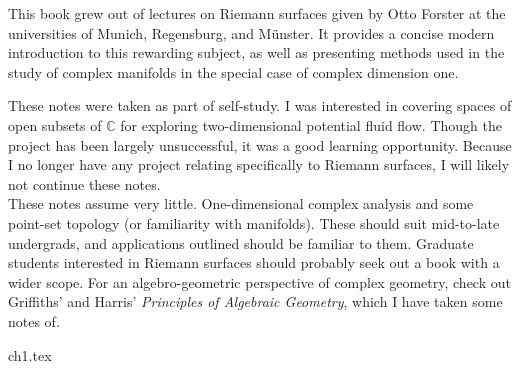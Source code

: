 \documentclass{../booknotes}
\begin{document}
\maketitle

\begin{pubdescrip}
This book grew out of lectures on Riemann surfaces given by Otto Forster at the universities of Munich, Regensburg, and Münster. It provides a concise modern introduction to this rewarding subject, as well as presenting methods used in the study of complex manifolds in the special case of complex dimension one.
\end{pubdescrip}

\begin{transcribernote}
	\indent These notes were taken as part of self-study. I was interested in covering spaces of open subsets of $ \mathbb{C} $ for exploring two-dimensional potential fluid flow. Though the project has been largely unsuccessful, it was a good learning opportunity. Because I no longer have any project relating specifically to Riemann surfaces, I will likely not continue these notes.\\
	\indent These notes assume very little. One-dimensional complex analysis and some point-set topology (or familiarity with manifolds). These should suit mid-to-late undergrads, and applications outlined should be familiar to them. Graduate students interested in Riemann surfaces should probably seek out a book with a wider scope. For an algebro-geometric perspective of complex geometry, check out Griffiths' and Harris' \textit{Principles of Algebraic Geometry}, which I have taken some notes of.
\end{transcribernote}

\tableofcontents

{ch1.tex}
\end{document}
